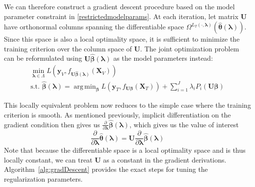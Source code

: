 \documentclass[12pt,letterpaper]{article}
\DeclareMathOperator*{\argmin}{arg\,min}
\begin{document}
We can therefore construct a gradient descent procedure based on the model parameter constraint in \eqref{restrictedmodelparams}. At each iteration, let matrix $\boldsymbol U$ have orthonormal columns spanning the differentiable space $\Omega^{L_T(\cdot, \boldsymbol{\lambda})}(\hat {\boldsymbol \theta}(\boldsymbol{\lambda}))$. Since this space is also a local optimality space, it is sufficient to minimize the training criterion over the column space of $\boldsymbol U$. The joint optimization problem can be reformulated using $\boldsymbol U \hat {\boldsymbol \beta}(\boldsymbol{\lambda})$ as the model parameters instead:
\begin{equation}
\begin{array}{c}
\min_{\boldsymbol \lambda \in \Lambda} L(\boldsymbol y_V, f_{\boldsymbol U \hat{\boldsymbol \beta} (\boldsymbol \lambda) }(\boldsymbol X_V)) \\
\text{s.t. } \hat{\boldsymbol \beta} (\boldsymbol \lambda) =
\argmin_{\boldsymbol \beta}
L(\boldsymbol y_T, f_{\boldsymbol U \boldsymbol \beta}(\boldsymbol X_T))
+ \sum\limits_{i=1}^J \lambda_i P_i(\boldsymbol U \boldsymbol \beta)
\end{array}
\end{equation}

This locally equivalent problem now reduces to the simple case where the training criterion is smooth. As mentioned previously, implicit differentiation on the gradient condition then gives us $\frac{\partial}{\partial \boldsymbol \lambda}\hat{\boldsymbol \beta}(\boldsymbol \lambda)$, which gives us the value of interest
\begin{equation}
\frac{\partial}{\partial \boldsymbol \lambda}
\hat{\boldsymbol \theta}(\boldsymbol \lambda) =
\boldsymbol U
\frac{\partial}{\partial \boldsymbol \lambda}\hat{\boldsymbol \beta}(\boldsymbol \lambda)
\end{equation}
Note that because the differentiable space is a local optimality space and is thus locally constant, we can treat $\boldsymbol U$ as a constant in the gradient derivations. Algorithm~\ref{alg:gradDescent} provides the exact steps for tuning the regularization parameters.
\end{document}
